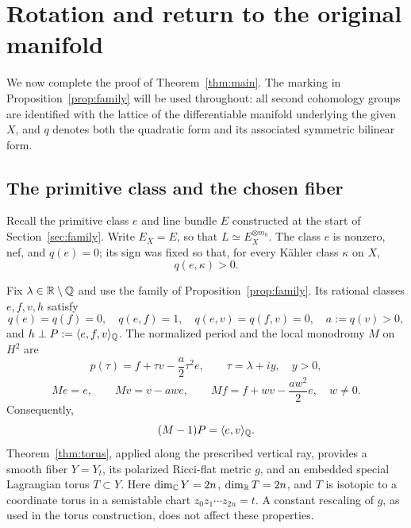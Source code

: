 \section{Rotation and return to the original manifold}
\label{sec:rotation}

We now complete the proof of Theorem~\ref{thm:main}.  The marking in
Proposition~\ref{prop:family} will be used throughout: all second
cohomology groups are identified with the lattice of the differentiable
manifold underlying the given $X$, and $q$ denotes both the quadratic
form and its associated symmetric bilinear form.

\subsection{The primitive class and the chosen fiber}

Recall the primitive class $e$ and line bundle $E$ constructed at the
start of Section~\ref{sec:family}. Write $E_X=E$, so that
$L\simeq E_X^{\otimes m_0}$. The class $e$ is nonzero, nef, and
$q(e)=0$; its sign was fixed so that, for every K\"ahler class
$\kappa$ on $X$,
\begin{equation}
                    q(e,\kappa)>0.
\label{eq:rotation-original-sign}
\end{equation}

Fix $\lambda\in\mathbb R\setminus\mathbb Q$ and use the family of
Proposition~\ref{prop:family}.  Its rational classes $e,f,v,h$ satisfy
\[
 q(e)=q(f)=0,\quad q(e,f)=1,\quad
 q(e,v)=q(f,v)=0,\quad a:=q(v)>0,
\]
and $h\perp P:=\langle e,f,v\rangle_{\mathbb Q}$.  The normalized period
and the local monodromy $M$ on $H^2$ are
\begin{equation}
 p(\tau)=f+\tau v-\frac a2\tau^2e,
       \qquad\tau=\lambda+iy,\quad y>0,
\label{eq:rotation-period}
\end{equation}
\begin{equation}
 Me=e,\qquad Mv=v-aw e,\qquad
 Mf=f+w v-\frac{aw^2}{2}e,\quad w\ne0.
\label{eq:rotation-monodromy}
\end{equation}
Consequently,
\begin{equation}
                    (M-1)P=\langle e,v\rangle_{\mathbb Q}.
\label{eq:rotation-monodromy-image}
\end{equation}
Theorem~\ref{thm:torus}, applied along the prescribed vertical ray,
provides a smooth fiber $Y=Y_t$, its polarized Ricci-flat metric $g$,
and an embedded special Lagrangian torus $T\subset Y$.  Here
$\dim_{\mathbb C}Y=2n$, $\dim_{\mathbb R}T=2n$, and $T$ is isotopic to a
coordinate torus in a semistable chart
$z_0z_1\cdots z_{2n}=t$.  A constant rescaling of $g$, as used in
the torus construction, does not affect these properties.

